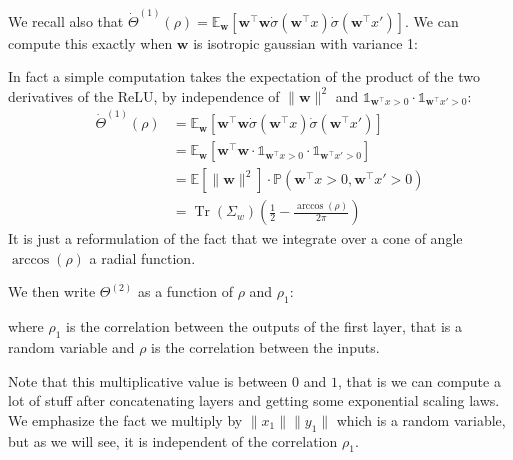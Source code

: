 \documentclass[a4paper]{article}
\begin{document}
We recall also that $\dot{\Theta}^{(1)}(\rho) = \mathbb{E}_{\bm{w}} \left[  \bm{w}^\top \bm{w} \dot{\sigma}(\bm{w}^\top x) \dot{\sigma}(\bm{w}^\top x') \right]$. We can compute this exactly when $\bm{w}$ is isotropic gaussian with variance 1:




In fact a simple computation takes the expectation of the product of the two derivatives of the ReLU, by independence of $\|\bm{w}\|^2$ and $\mathbb{1}_{\bm{w}^\top x > 0} \cdot \mathbb{1}_{\bm{w}^\top x' > 0}$:
\begin{align*}
\dot{\Theta}^{(1)}(\rho) &= \mathbb{E}_{\bm{w}} \left[  \bm{w}^\top \bm{w} \dot{\sigma}(\bm{w}^\top x) \dot{\sigma}(\bm{w}^\top x') \right] \\
&= \mathbb{E}_{\bm{w}} \left[  \bm{w}^\top \bm{w} \cdot \mathbb{1}_{\bm{w}^\top x > 0} \cdot \mathbb{1}_{\bm{w}^\top x' > 0} \right] \\
&= \mathbb{E}\!\left[ \|\bm{w}\|^2 \right] \cdot \mathbb{P}(\bm{w}^\top x > 0, \bm{w}^\top x' > 0) \\
&= \operatorname{Tr}(\Sigma_w)\left(\frac{1}{2} - \frac{\arccos(\rho)}{2\pi}\right)
\end{align*}
It is just a reformulation of the fact that we integrate over a cone of angle $\arccos(\rho)$ a radial function.

We then write $\Theta^{(2)}$ as a function of $\rho$ and $\rho_1$:
\begin{center}
\end{center}

where $\rho_1$ is the correlation between the outputs of the first layer, that is a random variable and $\rho$ is the correlation between the inputs.

Note that this multiplicative value is between $0$ and $1$, that is we can compute a lot of stuff after concatenating layers and getting some exponential scaling laws.
We emphasize the fact we multiply by $\|x_1\| \|y_1\|$ which is a random variable, but as we will see, it is independent of the correlation $\rho_1$.
\end{document}
